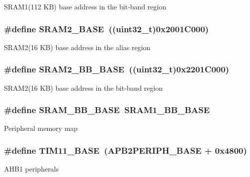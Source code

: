 S\-R\-A\-M1(112 K\-B) base address in the bit-\/band region \hypertarget{group___peripheral__memory__map_gadbb42a3d0a8a90a79d2146e4014241b1}{
\subsubsection[{S\-R\-A\-M2\-\_\-\-B\-A\-S\-E}]{\setlength{\rightskip}{0pt plus 5cm}\#define S\-R\-A\-M2\-\_\-\-B\-A\-S\-E~((uint32\-\_\-t)0x2001\-C000)}}\label{group___peripheral__memory__map_gadbb42a3d0a8a90a79d2146e4014241b1}
S\-R\-A\-M2(16 K\-B) base address in the alias region \hypertarget{group___peripheral__memory__map_gac33cb6edadf184ab9860d77089503922}{
\subsubsection[{S\-R\-A\-M2\-\_\-\-B\-B\-\_\-\-B\-A\-S\-E}]{\setlength{\rightskip}{0pt plus 5cm}\#define S\-R\-A\-M2\-\_\-\-B\-B\-\_\-\-B\-A\-S\-E~((uint32\-\_\-t)0x2201\-C000)}}\label{group___peripheral__memory__map_gac33cb6edadf184ab9860d77089503922}
S\-R\-A\-M2(16 K\-B) base address in the bit-\/band region \hypertarget{group___peripheral__memory__map_gad3548b6e2f017f39d399358f3ac98454}{
\subsubsection[{S\-R\-A\-M\-\_\-\-B\-B\-\_\-\-B\-A\-S\-E}]{\setlength{\rightskip}{0pt plus 5cm}\#define S\-R\-A\-M\-\_\-\-B\-B\-\_\-\-B\-A\-S\-E~{\bf S\-R\-A\-M1\-\_\-\-B\-B\-\_\-\-B\-A\-S\-E}}}\label{group___peripheral__memory__map_gad3548b6e2f017f39d399358f3ac98454}
Peripheral memory map \hypertarget{group___peripheral__memory__map_ga3a4a06bb84c703084f0509e105ffaf1d}{
\subsubsection[{T\-I\-M11\-\_\-\-B\-A\-S\-E}]{\setlength{\rightskip}{0pt plus 5cm}\#define T\-I\-M11\-\_\-\-B\-A\-S\-E~(A\-P\-B2\-P\-E\-R\-I\-P\-H\-\_\-\-B\-A\-S\-E + 0x4800)}}\label{group___peripheral__memory__map_ga3a4a06bb84c703084f0509e105ffaf1d}
A\-H\-B1 peripherals 